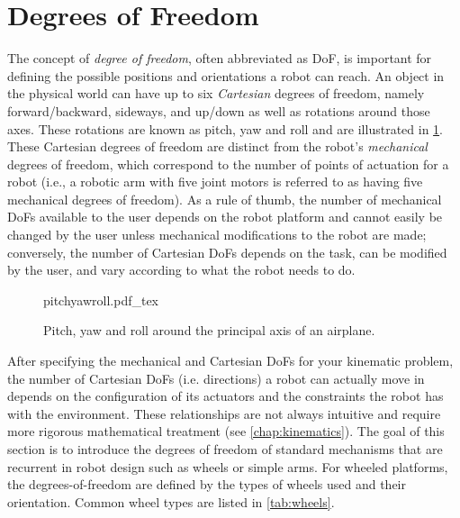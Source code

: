 \section{Degrees of Freedom}\label{sec:dof}

The concept of \textsl{degree of freedom}, often abbreviated as DoF, is important for defining the possible positions and orientations a robot can reach. An object in the physical world can have up to six \textsl{Cartesian} degrees of freedom, namely forward/backward, sideways, and up/down as well as rotations around those axes. These rotations are known as pitch, yaw and roll and are illustrated in \cref{fig:pitchyawandroll}. These Cartesian degrees of freedom are distinct from the robot's \textsl{mechanical} degrees of freedom, which correspond to the number of points of actuation for a robot (i.e., a robotic arm with five joint motors is referred to as having five mechanical degrees of freedom).
As a rule of thumb, the number of mechanical DoFs available to the user depends on the robot platform and cannot easily be changed by the user unless mechanical modifications to the robot are made; conversely, the number of Cartesian DoFs depends on the task, can be modified by the user, and vary according to what the robot needs to do.

\begin{figure}
    \centering
    \def\svgwidth{\textwidth}
    {pitchyawroll.pdf_tex}
    \caption{Pitch, yaw and roll around the principal axis of an airplane.}
    \label{fig:pitchyawandroll}
\end{figure}

After specifying the mechanical and Cartesian DoFs for your kinematic problem, the number of Cartesian DoFs (i.e. directions) a robot can actually move in depends on the configuration of its actuators and the constraints the robot has with the environment. These relationships are not always intuitive and require more rigorous mathematical treatment (see \cref{chap:kinematics}). The goal of this section is to introduce the degrees of freedom of standard mechanisms that are recurrent in robot design such as wheels or simple arms. For wheeled platforms, the degrees-of-freedom are defined by the types of wheels used and their orientation. Common wheel types are listed in \cref{tab:wheels}.

